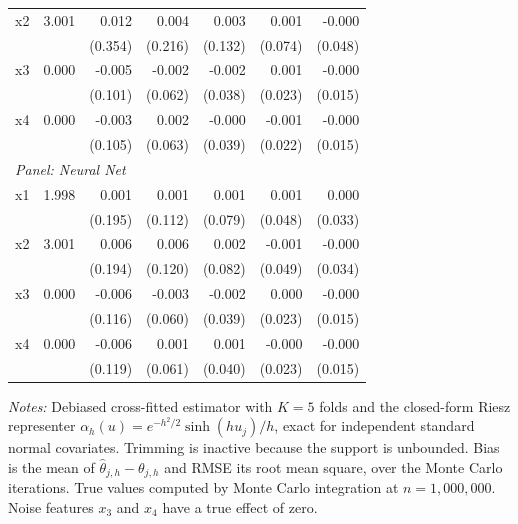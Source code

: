 \begin{table}[htbp]
\begin{threeparttable}
\begin{tabular}{lrrrrrr}
\quad x2 & 3.001 & 0.012 & 0.004 & 0.003 & 0.001 & -0.000 \\
 &  & (0.354) & (0.216) & (0.132) & (0.074) & (0.048) \\
\quad x3 & 0.000 & -0.005 & -0.002 & -0.002 & 0.001 & -0.000 \\
 &  & (0.101) & (0.062) & (0.038) & (0.023) & (0.015) \\
\quad x4 & 0.000 & -0.003 & 0.002 & -0.000 & -0.001 & -0.000 \\
 &  & (0.105) & (0.063) & (0.039) & (0.022) & (0.015) \\
\midrule
\multicolumn{7}{l}{\textit{Panel: Neural Net}} \\
\quad x1 & 1.998 & 0.001 & 0.001 & 0.001 & 0.001 & 0.000 \\
 &  & (0.195) & (0.112) & (0.079) & (0.048) & (0.033) \\
\quad x2 & 3.001 & 0.006 & 0.006 & 0.002 & -0.001 & -0.000 \\
 &  & (0.194) & (0.120) & (0.082) & (0.049) & (0.034) \\
\quad x3 & 0.000 & -0.006 & -0.003 & -0.002 & 0.000 & -0.000 \\
 &  & (0.116) & (0.060) & (0.039) & (0.023) & (0.015) \\
\quad x4 & 0.000 & -0.006 & 0.001 & 0.001 & -0.000 & -0.000 \\
 &  & (0.119) & (0.061) & (0.040) & (0.023) & (0.015) \\
\bottomrule
\end{tabular}
\begin{tablenotes}
\footnotesize
\item \textit{Notes:} Debiased cross-fitted estimator with $K=5$ folds and the closed-form Riesz representer $\alpha_h(u) = e^{-h^2/2}\sinh(h u_j)/h$, exact for independent standard normal covariates. Trimming is inactive because the support is unbounded. Bias is the mean of $\hat{\theta}_{j,h} - \theta_{j,h}$ and RMSE its root mean square, over the Monte Carlo iterations. True values computed by Monte Carlo integration at $n=1{,}000{,}000$. Noise features $x_3$ and $x_4$ have a true effect of zero.
\end{tablenotes}
\end{threeparttable}
\end{table}